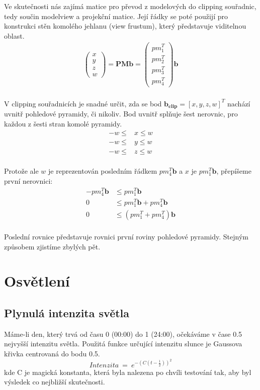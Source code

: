 \documentclass{zcu_sp}
\begin{document}
Ve skutečnosti nás zajímá matice pro převod z modelových do clipping souřadnic, tedy součin modelview a projekční matice. Její řádky se poté použijí pro konstrukci stěn komolého jehlanu (view frustum), který představuje viditelnou oblast.
\begin{align*}
\begin{pmatrix}x\\y\\z\\w\end{pmatrix} = \mathbf{PM} \mathbf{b} = \begin{pmatrix}pm_1^T\\pm_2^T\\pm_3^T\\pm_4^T\end{pmatrix} \mathbf{b}\\
\end{align*}

V clipping souřadnicích je snadné určit, zda se bod $\mathbf{b_{clip}} = \left[
x, y, z, w \right]^T$ nachází uvnitř pohledové pyramidy, či nikoliv. Bod uvnitř splňuje šest nerovnic, pro každou z šesti stran komolé pyramidy.
\begin{align*}
-w \leq & x \leq w \\
-w \leq & y \leq w \\
-w \leq & z \leq w \\
\end{align*}

Protože ale $w$ je reprezentován posledním řádkem $pm_4^T \mathbf{b}$ a $x$ je
$pm_1^T \mathbf{b}$, přepíšeme první nerovnici:
\begin{align*}
-pm_4^T \mathbf{b} &\leq pm_1^T \mathbf{b} \\ 
0 &\leq pm_1^T \mathbf{b} + pm_4^T \mathbf{b} \\
0 &\leq (pm_1^T + pm_4^T) \mathbf{b} \\
\end{align*}

Poslední rovnice představuje rovnici první roviny pohledové pyramidy. Stejným
způsobem zjistíme zbylých pět. 



\section{Osvětlení}
\subsection{Plynulá intenzita světla}
Máme-li den, který trvá od času 0 (00:00) do 1 (24:00), očekáváme v čase 0.5
nejvyšší intenzitu světla. Použitá funkce určující intenzitu slunce je Gaussova
křivka centrovaná do bodu 0.5.
$$
Intenzita~=~e^{- (C(t - \frac{1}{2}))^2}
$$
kde C je magická konstanta, která byla nalezena po chvíli testování tak, aby
byl výsledek co nejbližší skutečnosti.
\end{document}
